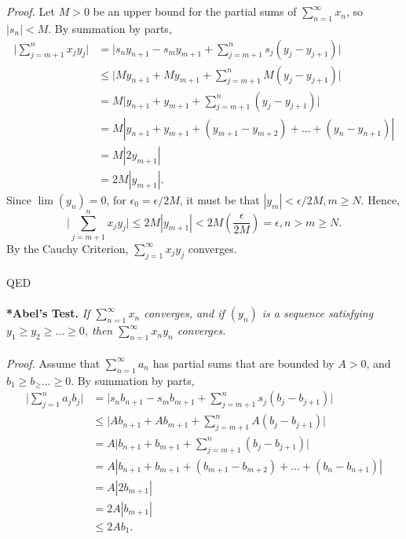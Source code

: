 \documentclass{article}
\begin{document}
            \\ \\
            \textit{Proof.} Let $M>0$ be an upper bound for the partial sums of $\sum_{n=1}^\infty x_n$, so $|s_n|<M$. By summation by parts,
            \begin{align*}
                \Bigg|\sum_{j=m+1}^n x_j y_j\Bigg| & = \Bigg|s_n y_{n+1} - s_m y_{m+1} + \sum_{j=m+1}^n s_j(y_j-y_{j+1})\Bigg| \\
                & \leq \Bigg|M y_{n+1} + M y_{m+1} + \sum_{j=m+1}^n M(y_j-y_{j+1})\Bigg| \\
                & = M \Bigg|y_{n+1} + y_{m+1} + \sum_{j=m+1}^n (y_j-y_{j+1})\Bigg| \\
                & = M |y_{n+1} + y_{m+1} + (y_{m+1}-y_{m+2}) + \dots + (y_n-y_{n+1})| \\
                & = M |2 y_{m+1}| \\
                & = 2M|y_{m+1}|.
            \end{align*}
            Since $\lim(y_n)=0$, for $\epsilon_0 = \epsilon/2M$, it must be that $|y_m|<\epsilon/2M,m \geq N$. Hence,
            \begin{equation*}
                \Bigg|\sum_{j=m+1}^n x_j y_j\Bigg| \leq 2M|y_{m+1}| < 2M (\frac{\epsilon}{2M}) = \epsilon, n > m \geq N.
            \end{equation*}
            By the Cauchy Criterion, $\sum_{j=1}^\infty x_j y_j$ converges.
            \\ \\
            QED
            \\ \\
            \textbf{*Abel's Test.} \textit{If $\sum_{n=1}^\infty x_n$ converges, and if $(y_n)$ is a sequence satisfying $y_1 \geq y_2 \geq \dots \geq 0$, then $\sum_{n=1}^\infty x_n y_n$ converges.}\\ \\
            \textit{Proof.} Assume that $\sum_{n=1}^\infty a_n$ has partial sums that are bounded by $A>0$, and $b_1 \geq b_ \geq \dots \geq 0$. By summation by parts,
            \begin{align*}
                \Bigg|\sum_{j=1}^n a_j b_j\Bigg| & = \Bigg|s_n b_{n+1} - s_m b_{m+1} + \sum_{j=m+1}^n s_j(b_j-b_{j+1})\Bigg| \\
                & \leq \Bigg|A b_{n+1} + A b_{m+1} + \sum_{j=m+1}^n A(b_j-b_{j+1})\Bigg| \\
                & = A \Bigg|b_{n+1} + b_{m+1} + \sum_{j=m+1}^n (b_j-b_{j+1})\Bigg| \\
                & = A |b_{n+1} + b_{m+1} + (b_{m+1}-b_{m+2})+\dots+(b_{n}-b_{n+1})| \\
                & = A|2b_{m+1}| \\
                & = 2A|b_{m+1}| \\
                & \leq 2Ab_1.
            \end{align*}
\end{document}
